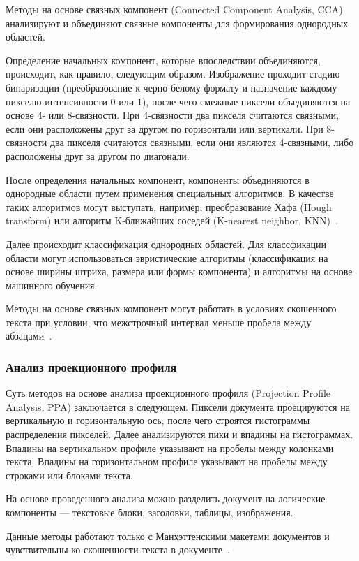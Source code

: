 Методы на основе связных компонент (Connected Component Analysis, CCA) анализируют и объединяют связные компоненты для формирования однородных областей.

Определение начальных компонент, которые впоследствии объединяются, происходит, как правило, следующим образом.
Изображение проходит стадию бинаризации (преобразование к черно-белому формату и назначение каждому пикселю интенсивности 0 или 1), после чего смежные пиксели объединяются на основе 4- или 8-связности.
При 4-связности два пикселя считаются связными, если они расположены друг за другом по горизонтали или вертикали.
При 8-связности два пикселя считаются связными, если они являются 4-связными, либо расположены друг за другом по диагонали.

После определения начальных компонент, компоненты объединяются в однородные области путем применения специальных алгоритмов.
В качестве таких алгоритмов могут выступать, например, преобразование Хафа (Hough transform) или алгоритм K-ближайших соседей (K-nearest neighbor, KNN)~\cite{dla-book}.

Далее происходит классификация однородных областей.
Для классфикации области могут использоваться эвристические алгоритмы (классификация на основе ширины штриха, размера или формы компонента) и алгоритмы на основе машинного обучения.

Методы на основе связных компонент могут работать в условиях скошенного текста при условии, что межстрочный интервал меньше пробела между абзацами~\cite{dla-book}.

\subsubsection{Анализ проекционного профиля}

Суть методов на основе анализа проекционного профиля (Projection Profile Analysis, PPA) заключается в следующем.
Пиксели документа проецируются на вертикальную и горизонтальную ось, после чего строятся гистограммы распределения пикселей.
Далее анализируются пики и впадины на гистограммах.
Впадины на вертикальном профиле указывают на пробелы между колонками текста.
Впадины на горизонтальном профиле указывают на пробелы между строками или блоками текста.

На основе проведенного анализа можно разделить документ на логические компоненты --- текстовые блоки, заголовки, таблицы, изображения.

Данные методы работают только с Манхэттенскими макетами документов и чувствительны ко скошенности текста в документе~\cite{dla-book}.


